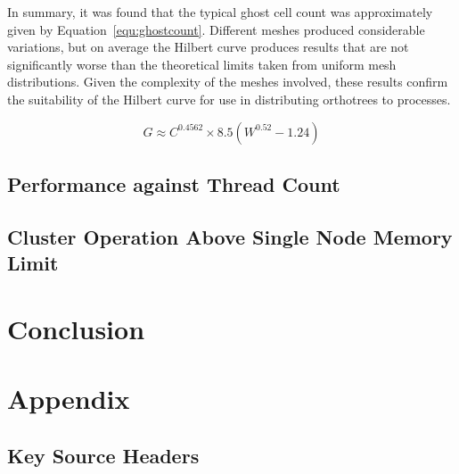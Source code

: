 \documentclass[twoside]{IIBproject}
\numberwithin{figure}{section}
\begin{document}
        In summary, it was found that the typical ghost cell count was approximately given by Equation~\ref{equ:ghostcount}. Different meshes produced considerable variations, but on average the Hilbert curve produces results that are not significantly worse than the theoretical limits taken from uniform mesh distributions. Given the complexity of the meshes involved, these results confirm the suitability of the Hilbert curve for use in distributing orthotrees to processes.

        \begin{equation}
            G \approx C^{0.4562} \times 8.5(W^{0.52}-1.24)
            \label{equ:ghostcount}
        \end{equation}



    \subsection{Performance against Thread Count} %
        \label{sec:results-performance}



    \subsection{Cluster Operation Above Single Node Memory Limit}
        \label{sec:results-memory}




\section{Conclusion} %
    \label{sec:conclusions}



\printbibliography


\clearpage
\appendix

\section{Appendix} %
    \label{sec:appendix}

    \subsection{Key Source Headers} %
        \label{sec:appendix-headers}
\end{document}
